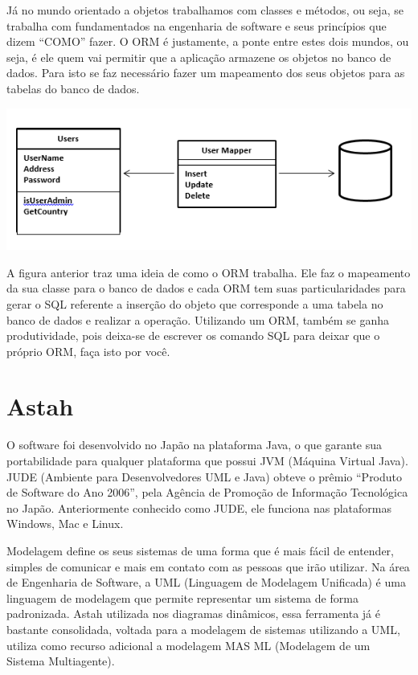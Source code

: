 Já no mundo orientado a objetos trabalhamos com classes e métodos, ou seja, se trabalha com fundamentados na engenharia de software e seus princípios que dizem “COMO” fazer. O ORM é justamente, a ponte entre estes dois mundos, ou seja, é ele quem vai permitir que a aplicação armazene os objetos no banco de dados. Para isto se faz necessário fazer um mapeamento dos seus objetos para as tabelas do banco de dados.
\begin{center}
\includegraphics[scale=0.7]{imagens/work-orm.png}
\end{center}

A figura anterior traz uma ideia de como o ORM trabalha. Ele faz o mapeamento da sua classe para o banco de dados e cada ORM tem suas particularidades para gerar o SQL referente a inserção do objeto que corresponde a uma tabela no banco de dados e realizar a operação. Utilizando um ORM, também se ganha produtividade, pois deixa-se de escrever os comando SQL para deixar que o próprio ORM, faça isto por você. \cite{cadu_conceitos_2011}

\section{Astah}
O software foi desenvolvido no Japão na plataforma Java, o que garante sua portabilidade para qualquer plataforma que possui JVM (Máquina Virtual Java). JUDE (Ambiente para Desenvolvedores UML e Java) obteve o prêmio “Produto de Software do Ano 2006”, pela Agência de Promoção de Informação Tecnológica no Japão. Anteriormente conhecido como JUDE, ele funciona nas plataformas Windows, Mac e Linux. \cite{franco_neto_tutorial_2017}

Modelagem define os seus sistemas de uma forma que é mais fácil de entender, simples de comunicar e mais em contato com as pessoas que irão utilizar. Na área de Engenharia de Software, a UML (Linguagem de Modelagem Unificada) é uma linguagem de modelagem que permite representar um sistema de forma padronizada. Astah utilizada nos diagramas dinâmicos, essa ferramenta já é bastante consolidada, voltada para a modelagem de sistemas utilizando a UML, utiliza como recurso adicional a modelagem MAS ML (Modelagem de um Sistema Multiagente).

